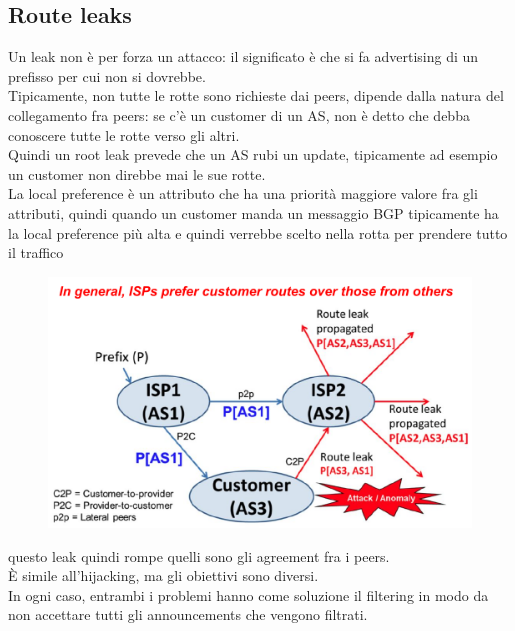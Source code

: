 \documentclass[12pt, oneside]{extbook} %
\begin{document}
\subsection{Route leaks}
Un leak non è per forza un attacco: il significato è che si fa advertising di un prefisso per cui non si dovrebbe.
\\Tipicamente, non tutte le rotte sono richieste dai peers, dipende dalla natura del collegamento fra peers: se c'è un customer di un AS, non è detto che debba conoscere tutte le rotte verso gli altri.
\\Quindi un root leak prevede che un AS rubi un update, tipicamente ad esempio un customer non direbbe mai le sue rotte.
\\La local preference è un attributo che ha una priorità maggiore valore fra gli attributi, quindi quando un customer manda un messaggio BGP tipicamente ha la local preference più alta e quindi verrebbe scelto nella rotta per prendere tutto il traffico\\
\begin{figure}[h!]
    \centering
    \includegraphics[scale=0.5]{../../immagini/route_leaks}
\end{figure}
questo leak quindi rompe quelli sono gli agreement fra i peers.
\\È simile all'hijacking, ma gli obiettivi sono diversi.
\\In ogni caso, entrambi i problemi hanno come soluzione il filtering in modo da non accettare tutti gli announcements che vengono filtrati.
\end{document}
